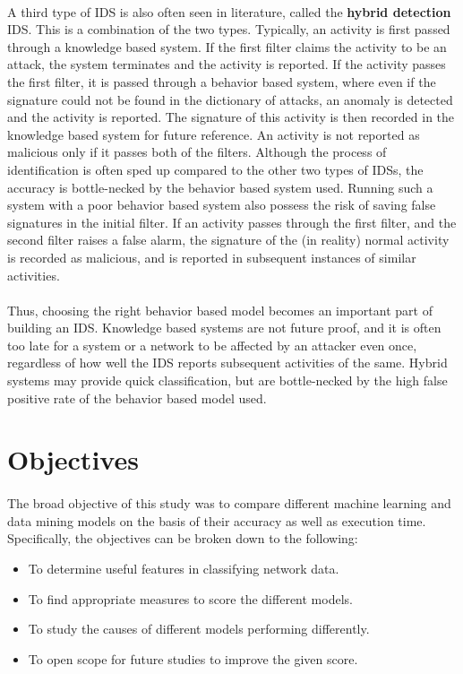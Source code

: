\paragraph{}
A third type of IDS is also often seen in literature, called the \textbf{hybrid detection} IDS. This is a combination of the two types. Typically, an activity is first passed through a knowledge based system. If the first filter claims the activity to be an attack, the system terminates and the activity is reported. If the activity passes the first filter, it is passed through a behavior based system, where even if the signature could not be found in the dictionary of attacks, an anomaly is detected and the activity is reported. The signature of this activity is then recorded in the knowledge based system for future reference. An activity is not reported as malicious only if it passes both of the filters. Although the process of identification is often sped up compared to the other two types of IDSs, the accuracy is bottle-necked by the behavior based system used. Running such a system with a poor behavior based system also possess the risk of saving false signatures in the initial filter. If an activity passes through the first filter, and the second filter raises a false alarm, the signature of the (in reality) normal activity is recorded as malicious, and is reported in subsequent instances of similar activities.

\paragraph{}
Thus, choosing the right behavior based model becomes an important part of building an IDS. Knowledge based systems are not future proof, and it is often too late for a system or a network to be affected by an attacker even once, regardless of how well the IDS reports subsequent activities of the same. Hybrid systems may provide quick classification, but are bottle-necked by the high false positive rate of the behavior based model used.

\section{Objectives}

\paragraph{}
The broad objective of this study was to compare different machine learning and data mining models on the basis of their accuracy as well as execution time.\\
Specifically, the objectives can be broken down to the following:
\begin{itemize}
    \item To determine useful features in classifying network data.
    \item To find appropriate measures to score the different models.
    \item To study the causes of different models performing differently.
    \item To open scope for future studies to improve the given score.
\end{itemize}

